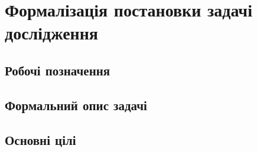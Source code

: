 \section{Формалізація постановки задачі дослідження}
\jointitles
\subsection{Робочі позначення}

\subsection{Формальний опис задачі}

\subsection{Основні цілі}